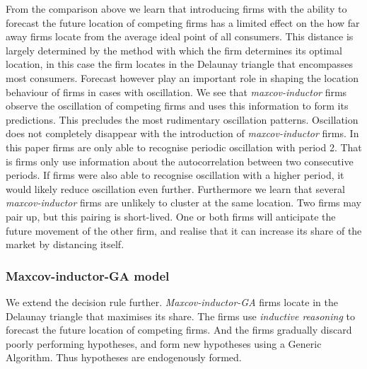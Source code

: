 \documentclass[preprint, 12pt]{elsarticle}
\begin{document}
From the comparison above we learn that introducing firms with the ability to forecast the future location of competing firms has a limited effect on the how far away firms locate from the average ideal point of all consumers. This distance is largely determined by the method with which the firm determines its optimal location, in this case the firm locates in the Delaunay triangle that encompasses most consumers. Forecast however play an important role in shaping the location behaviour of firms in cases with oscillation. We see that \emph{maxcov-inductor} firms observe the oscillation of competing firms and uses this information to form its predictions. This precludes the most rudimentary oscillation patterns. Oscillation does not completely disappear with the introduction of \emph{maxcov-inductor} firms. In this paper firms are only able to recognise periodic oscillation with period 2. That is firms only use information about the autocorrelation between two consecutive periods. If firms were also able to recognise oscillation with a higher period, it would likely reduce oscillation even further. Furthermore we learn that several \emph{maxcov-inductor} firms are unlikely to cluster at the same location. Two firms may pair up, but this pairing is short-lived. One or both firms will anticipate the future movement of the other firm, and realise that it can increase its share of the market by distancing itself.

\subsubsection{Maxcov-inductor-GA model}

We extend the decision rule further. \emph{Maxcov-inductor-GA} firms locate in the Delaunay triangle that maximises its share. The firms use \emph{inductive reasoning} to forecast the future location of competing firms. And the firms gradually discard poorly performing hypotheses, and form new hypotheses using a Generic Algorithm. Thus hypotheses are endogenously formed.
\end{document}

